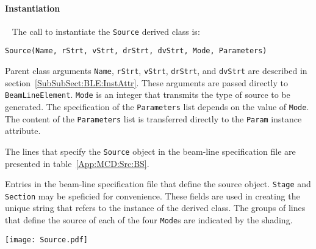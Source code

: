 \paragraph{Instantiation} ~\newline
\noindent
The call to instantiate the \texttt{Source} derived class is:
\begin{center}
  \texttt{Source(Name, rStrt, vStrt, drStrt, dvStrt,
          Mode, Parameters)}
\end{center}
Parent class arguments \texttt{Name}, \texttt{rStrt}, \texttt{vStrt},
\texttt{drStrt}, and \texttt{dvStrt} are described in
section~\ref{SubSubSect:BLE:InstAttr}.
These arguments are passed directly to \texttt{BeamLineElement}.
\texttt{Mode} is an integer that transmits the type of source to be
generated.
The specification of the \texttt{Parameters} list depends on the value
of \texttt{Mode}.
The content of the \texttt{Parameters} list is transferred directly to
the \texttt{Param} instance attribute.

The lines that specify the \texttt{Source} object in the beam-line
specification file are presented in table~\ref{App:MCD:Src:BS}. 
\begin{table}[h]
  \caption{
    Entries in the beam-line specification file that define the
    source object.
    \texttt{Stage} and \texttt{Section} may be speficied for
    convenience.
    These fields are used in creating the unique string that refers
    to the instance of the derived class.
    The groups of lines that define the source of each of the 
    four \texttt{Mode}s are indicated by the shading.
  }
  \label{App:MCD:Src:BS}
  \begin{center}
    \texttt{[image: Source.pdf]}
  \end{center}
\end{table}

